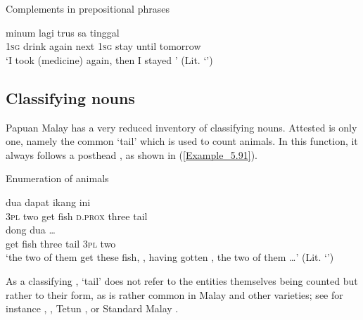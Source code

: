 \begin{styleExampleTitle}
Complements in prepositional phrases
\end{styleExampleTitle}
\ea
\label{Example_5.90}
 {minum} {lagi} {trus} {sa} {tinggal} {} {}\\ %
 \textsc{1sg}  drink  again  next  \textsc{1sg}  stay  until  tomorrow\\
 ‘I took (medicine) again, then I stayed ’ (Lit. ‘’) \textstyleExampleSource{[081015-005-NP.0042-0043]}
\z


\subsection{Classifying nouns}
\label{Para_5.2.6}
Papuan Malay has a very reduced inventory of classifying nouns. Attested is only one, namely the common   ‘tail’ which is used to count animals. In this function, it always follows a posthead , as shown in (\ref{Example_5.91}).


\begin{styleExampleTitle}
Enumeration of animals
\end{styleExampleTitle}

\ea
\label{Example_5.91}
 {{dua}} {{dapat}} {{ikang}} {{ini}} {{}} {}\\ %
 \textsc{3pl}  {two}  {get}  {fish}  {\textsc{d.prox}}  {three}  tail\\
   {}  {}  {}  dong  {dua}  {{\ldots}}\\
 {get}  {fish}  {three}  {tail}  \textsc{3pl}  {two}  {}\\
\glt 
‘the two of them get these fish, , having gotten , the two of them {\ldots}’ (Lit. ‘’) \textstyleExampleSource{[081109-011-JR.0003]}
\z


As a classifying ,  ‘tail’ does not refer to the entities themselves being counted but rather to their form, as is rather common in Malay and other  varieties; see for instance  \citep[153]{vanMinde.1997},  \citep[62]{Litamahuputty.1994}, Tetun \citep{vanKlinken.1999}, or Standard Malay \citep[321–323]{Mintz.2002}.



